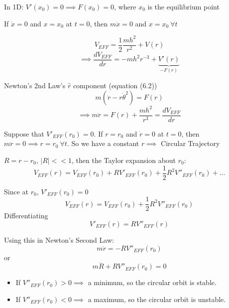 \documentclass[10pt]{scrartcl}
\begin{document}
In 1D: $V'(x_0) = 0 \implies F(x_0) = 0$, where $x_0$ is the equilibrium point

If $\dot{x} = 0$ and $x = x_0$ at $t = 0$, then $m\ddot{x} = 0$ and $x = x_0~\forall t$

\[V_{EFF} =\dfrac{1}{2}\dfrac{mh^2}{r^2} + V(r)\]
\[\implies \frac{dV_{EFF}}{dr} = -mh^2r^{-3} + \underbrace{V'(r)}_{-F(r)}\]

Newton's 2nd Law's $\hat{r}$ component (equation (6.2))
\[m(\ddot{r} - r\dot{\theta}^2) = F(r)\]
\[\implies m\ddot{r} = F(r) + \frac{mh^2}{r^3} = \frac{dV_{EFF}}{dr}\]

Suppose that $V'_{EFF}(r_0) = 0$. If $r = r_0$ and $\dot{r} = 0$ at $t = 0$, then $m\ddot{r} = 0 \implies r = r_0~\forall t$. So we have a constant $r\implies $ Circular Trajectory

$R = r-r_0$, $|R| << 1$, then the Taylor expansion about $r_0$:
\begin{equation}V_{EFF}(r) = V_{EFF}(r_0) + RV'_{EFF}(r_0) + \frac{1}{2}R^2V''_{EFF}(r_0) + \dots	
\end{equation}


Since at $r_0$, $V'_{EFF}(r_0) = 0$
\[V_{EFF}(r) = V_{EFF}(r_0) + \frac{1}{2}R^2V''_{EFF}(r_0)\]
Differentiating
\[V'_{EFF}(r) = RV''_{EFF}(r)\]

Using this in Newton's Second Law: 
\[m\ddot{r} = -RV''_{EFF}(r_0)\]
or 
\[m\ddot{R} + RV''_{EFF}(r_0)= 0\]

\begin{itemize}
\item If $V''_{EFF}(r_0)>0 \implies$ a minimum, so the circular orbit is stable.

\item If $V''_{EFF}(r_0) < 0 \implies$ a maximum, so the circular orbit is unstable. 
\end{itemize}~
\end{document}

